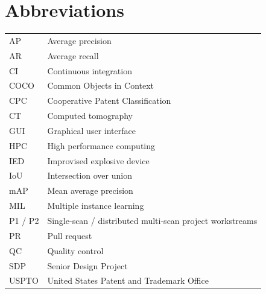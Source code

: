 \documentclass[12pt,a4paper,oneside]{report}
\begin{document}
\chapter*{Abbreviations}
\begin{tabular}{lp{}}
AP & Average precision\\
AR & Average recall\\
CI & Continuous integration\\
COCO & Common Objects in Context\\
CPC & Cooperative Patent Classification\\
CT & Computed tomography\\
GUI & Graphical user interface\\
HPC & High performance computing\\
IED & Improvised explosive device\\
IoU & Intersection over union\\
mAP & Mean average precision\\
MIL & Multiple instance learning\\
P1 / P2 & Single-scan / distributed multi-scan project workstreams\\
PR & Pull request\\
QC & Quality control\\
SDP & Senior Design Project\\
USPTO & United States Patent and Trademark Office\\
\end{tabular}
\clearpage
{}








\appendix

\end{document}
